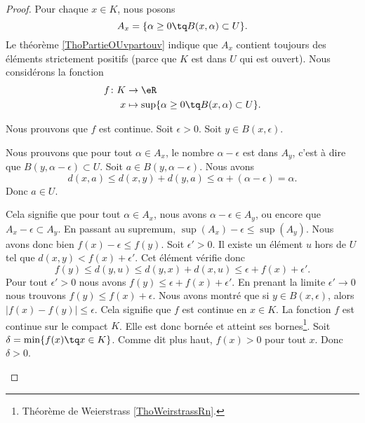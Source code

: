 \begin{proof}
    Pour chaque \( x\in K\), nous posons
    \begin{equation}
        A_x=\{ \alpha\geq 0\tq B(x,\alpha)\subset U \}.
    \end{equation}
    Le théorème \ref{ThoPartieOUvpartouv} indique que \( A_x\) contient toujours des éléments strictement positifs (parce que \( K\) est dans \( U\) qui est ouvert). Nous considérons la fonction
    \begin{equation}
        \begin{aligned}
            f\colon K&\to \eR \\
            x&\mapsto \sup\{ \alpha\geq 0\tq B(x,\alpha)\subset U \}. 
        \end{aligned}
    \end{equation}

    Nous prouvons que \( f\) est continue. Soit \( \epsilon>0\). Soit \( y\in B(x,\epsilon)\).
    \begin{subproof}
        Nous prouvons que pour tout \( \alpha\in A_x\), le nombre \( \alpha-\epsilon\) est dans \( A_y\), c'est à dire que \( B(y,\alpha-\epsilon)\subset U\). Soit \( a\in B(y,\alpha-\epsilon)\). Nous avons
        \begin{equation}
            d(x,a)\leq d(x,y)+d(y,a)\leq \alpha+(\alpha-\epsilon)=\alpha.
        \end{equation}
        Donc \( a\in U\).

        Cela signifie que pour tout \( \alpha\in A_x\), nous avons \( \alpha-\epsilon\in A_y\), ou encore que \( A_x-\epsilon\subset A_y\). En passant au supremum, \( \sup(A_x)-\epsilon\leq \sup(A_y)\). Nous avons donc bien \( f(x)-\epsilon\leq f(y)\).
        Soit \( \epsilon'>0\). Il existe un élément \( u\) hors de \( U\) tel que \( d(x,y)<f(x)+\epsilon'\). Cet élément vérifie donc
        \begin{equation}
            f(y)\leq d(y,u)\leq d(y,x)+d(x,u)\leq \epsilon+f(x)+\epsilon'.
        \end{equation}
        Pour tout \( \epsilon'>0\) nous avons \( f(y)\leq \epsilon+f(x)+\epsilon'\). En prenant la limite \( \epsilon'\to 0\) nous trouvons \( f(y)\leq f(x)+\epsilon\).
        Nous avons montré que si \(  y\in B(x,\epsilon) \), alors \( | f(x)-f(y) |\leq \epsilon\). Cela signifie que \( f\) est continue en \( x\in K\). 
        \spitem[Conclusion]
        La fonction \( f\) est continue sur le compact \( K\). Elle est donc bornée et atteint ses bornes\footnote{Théorème de Weierstrass \ref{ThoWeirstrassRn}.}. Soit \( \delta=\min\{ f(x)\tq x\in K \}\). Comme dit plus haut, \( f(x)>0\) pour tout \( x\). Donc \( \delta>0\).


\end{subproof}
\end{proof}
